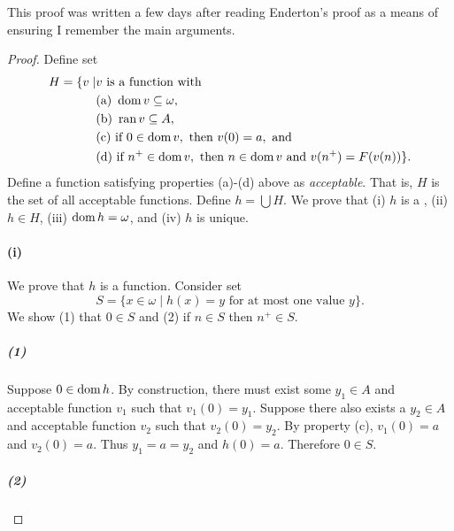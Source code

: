 \documentclass{report}
\begin{document}
  \begin{note}
    This proof was written a few days after reading Enderton's proof as a means
      of ensuring I remember the main arguments.
  \end{note}

  \begin{proof}

    Define set
      \begin{align*}
        H = \{ v \mid & v \text{ is a function with } \\
          & \text{(a) } \mathop{\text{dom}}{v} \subseteq \omega, \\
          & \text{(b) } \mathop{\text{ran}}{v} \subseteq A, \\
          & \text{(c) if } 0 \in \mathop{\text{dom}}{v}, \text{ then } v(0) = a, \text{ and} \\
          & \text{(d) if } n^+ \in \mathop{\text{dom}}{v},
            \text{ then } n \in \mathop{\text{dom}}{v} \text{ and } v(n^+) = F(v(n))
        \}.
      \end{align*}
    Define a function satisfying properties (a)-(d) above as
      \textit{acceptable}.
    That is, $H$ is the set of all acceptable functions.
    Define $h = \bigcup H$.
    We prove that (i) $h$ is a , (ii) $h \in H$, (iii)
      $\mathop{\text{dom}}{h} = \omega$, and (iv) $h$ is unique.

    \paragraph{(i)}%

      We prove that $h$ is a function.
      Consider set
        $$S = \{x \in \omega \mid h(x) = y \text{ for at most one value } y\}.$$
      We show (1) that $0 \in S$ and (2) if $n \in S$ then $n^+ \in S$.

      \subparagraph{(1)}%

        Suppose $0 \in \mathop{\text{dom}}{h}$.
        By construction, there must exist some $y_1 \in A$ and acceptable
          function $v_1$ such that $v_1(0) = y_1$.
        Suppose there also exists a $y_2 \in A$ and acceptable function $v_2$
          such that $v_2(0) = y_2$.
        By property (c), $v_1(0) = a$ and $v_2(0) = a$.
        Thus $y_1 = a = y_2$ and $h(0) = a$.
        Therefore $0 \in S$.

      \subparagraph{(2)}%


\end{proof}
\end{document}
